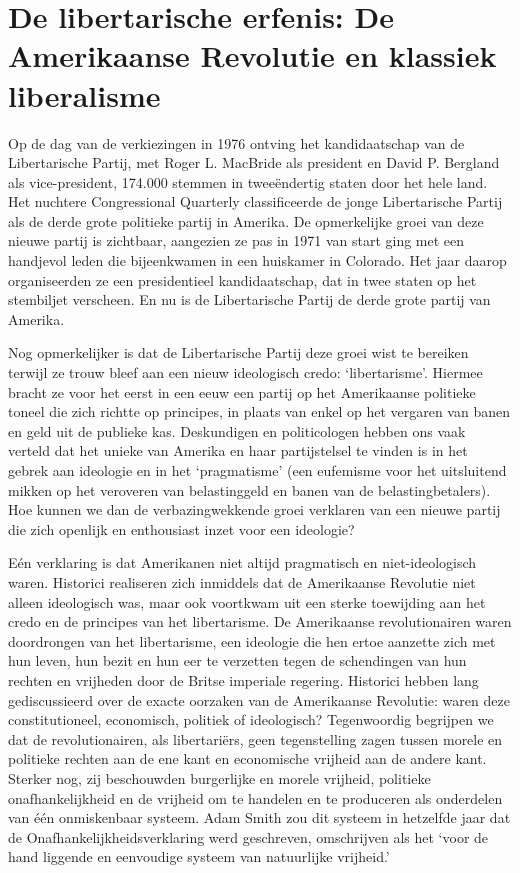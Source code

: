 \documentclass[
  a5paper,
  smalldemyvopaper,10pt,twoside,onecolumn,openright,extrafontsizes,hidelinks]{memoir}
\begin{document}

\chapter{De libertarische erfenis: De Amerikaanse Revolutie en klassiek
liberalisme}\label{de-libertarische-erfenis-de-amerikaanse-revolutie-en-klassiek-liberalisme}

Op de dag van de verkiezingen in 1976 ontving het kandidaatschap van de
Libertarische Partij, met Roger L. MacBride als president en David P.
Bergland als vice-president, 174.000 stemmen in tweeëndertig staten door
het hele land. Het nuchtere Congressional Quarterly classificeerde de
jonge Libertarische Partij als de derde grote politieke partij in
Amerika. De opmerkelijke groei van deze nieuwe partij is zichtbaar,
aangezien ze pas in 1971 van start ging met een handjevol leden die
bijeenkwamen in een huiskamer in Colorado. Het jaar daarop organiseerden
ze een presidentieel kandidaatschap, dat in twee staten op het
stembiljet verscheen. En nu is de Libertarische Partij de derde grote
partij van Amerika.

Nog opmerkelijker is dat de Libertarische Partij deze groei wist te
bereiken terwijl ze trouw bleef aan een nieuw ideologisch credo:
`libertarisme'. Hiermee bracht ze voor het eerst in een eeuw een partij
op het Amerikaanse politieke toneel die zich richtte op principes, in
plaats van enkel op het vergaren van banen en geld uit de publieke kas.
Deskundigen en politicologen hebben ons vaak verteld dat het unieke van
Amerika en haar partijstelsel te vinden is in het gebrek aan ideologie
en in het `pragmatisme' (een eufemisme voor het uitsluitend mikken op
het veroveren van belastinggeld en banen van de belastingbetalers). Hoe
kunnen we dan de verbazingwekkende groei verklaren van een nieuwe partij
die zich openlijk en enthousiast inzet voor een ideologie?

Eén verklaring is dat Amerikanen niet altijd pragmatisch en
niet-ideologisch waren. Historici realiseren zich inmiddels dat de
Amerikaanse Revolutie niet alleen ideologisch was, maar ook voortkwam
uit een sterke toewijding aan het credo en de principes van het
libertarisme. De Amerikaanse revolutionairen waren doordrongen van het
libertarisme, een ideologie die hen ertoe aanzette zich met hun leven,
hun bezit en hun eer te verzetten tegen de schendingen van hun rechten
en vrijheden door de Britse imperiale regering. Historici hebben lang
gediscussieerd over de exacte oorzaken van de Amerikaanse Revolutie:
waren deze constitutioneel, economisch, politiek of ideologisch?
Tegenwoordig begrijpen we dat de revolutionairen, als libertariërs, geen
tegenstelling zagen tussen morele en politieke rechten aan de ene kant
en economische vrijheid aan de andere kant. Sterker nog, zij beschouwden
burgerlijke en morele vrijheid, politieke onafhankelijkheid en de
vrijheid om te handelen en te produceren als onderdelen van één
onmiskenbaar systeem. Adam Smith zou dit systeem in hetzelfde jaar dat
de Onafhankelijkheidsverklaring werd geschreven, omschrijven als het
`voor de hand liggende en eenvoudige systeem van natuurlijke vrijheid.'
\end{document}
